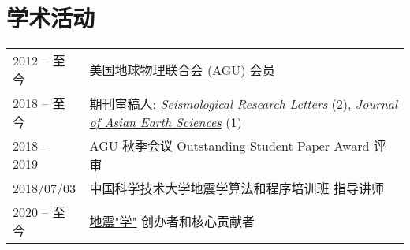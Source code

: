 \section*{学术活动}

\newcommand{\tabitem}{~~\llap{\textbullet}~~}

\begin{tabular}{p{} p{}}
2012 -- 至今 & \href{https://sites.agu.org/}{美国地球物理联合会 (AGU)} 会员 \\
2018 -- 至今 & 期刊审稿人:
                \textit{\href{https://pubs.geoscienceworld.org/srl/}{Seismological Research Letters}} (2),
                \textit{\href{https://www.journals.elsevier.com/journal-of-asian-earth-sciences/}{Journal of Asian Earth Sciences}} (1) \\
2018 -- 2019 & AGU 秋季会议 Outstanding Student Paper Award 评审 \\
2018/07/03   & 中国科学技术大学地震学算法和程序培训班 指导讲师 \\
2020 -- 至今 & \href{https://seismo-learn.org/}{地震"学"} 创办者和核心贡献者 \\
\end{tabular}
